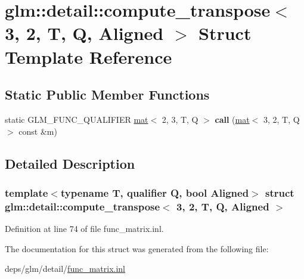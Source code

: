 \hypertarget{structglm_1_1detail_1_1compute__transpose_3_013_00_012_00_01T_00_01Q_00_01Aligned_01_4}{}\section{glm\+:\+:detail\+:\+:compute\+\_\+transpose$<$ 3, 2, T, Q, Aligned $>$ Struct Template Reference}
\label{structglm_1_1detail_1_1compute__transpose_3_013_00_012_00_01T_00_01Q_00_01Aligned_01_4}
\subsection*{Static Public Member Functions}
\begin{DoxyCompactItemize}
\item 
\mbox{\label{structglm_1_1detail_1_1compute__transpose_3_013_00_012_00_01T_00_01Q_00_01Aligned_01_4_adcfdfa46dfc616422904330e7a05cbf3}} 
static G\+L\+M\+\_\+\+F\+U\+N\+C\+\_\+\+Q\+U\+A\+L\+I\+F\+I\+ER \hyperlink{structglm_1_1mat}{mat}$<$ 2, 3, T, Q $>$ {\bfseries call} (\hyperlink{structglm_1_1mat}{mat}$<$ 3, 2, T, Q $>$ const \&m)
\end{DoxyCompactItemize}


\subsection{Detailed Description}
\subsubsection*{template$<$typename T, qualifier Q, bool Aligned$>$\newline
struct glm\+::detail\+::compute\+\_\+transpose$<$ 3, 2, T, Q, Aligned $>$}



Definition at line 74 of file func\+\_\+matrix.\+inl.



The documentation for this struct was generated from the following file\+:\begin{DoxyCompactItemize}
\item 
deps/glm/detail/\hyperlink{func__matrix_8inl}{func\+\_\+matrix.\+inl}\end{DoxyCompactItemize}
